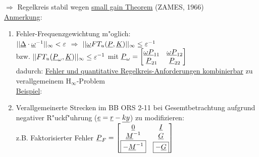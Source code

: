 \documentclass[openany,a4paper,11pt]{book}
\begin{document}
$\Rightarrow$ Regelkreis stabil wegen \uline{small gain Theorem}  (ZAMES, 1966)\\
\uline{Anmerkung}:\begin{enumerate}
    \item Fehler-Frequenzgewichtung m"oglich:\\
    $||\uline{\Delta}\cdot\uline{\omega}^{-1}||_\infty<\varepsilon$ $\Rightarrow$ $||\uline{\omega} FT_u(\uline{P},\uline{K})||_\infty\leq\varepsilon^{-1}$\\
    bzw. $|| FT_u(\uline{P}_\omega,\uline{K})||_\infty\leq\varepsilon^{-1}$ mit $\uline{P}_\omega=\begin{bmatrix} \uline{\omega P}_{11}&\uline{\omega P}_{12}\\\uline{P}_{21}&\uline{P}_{22}\end{bmatrix}$\\
    dadurch: \uline{Fehler und quantitative Regelkreis-Anforderungen kombinierbar} zu verallgemeinem H$_\infty$-Problem\\
    \uline{Beispiel}: 
    \item Verallgemeinerte Strecken im BB ORS 2-11 bei Gesemtbetrachtung aufgrund negativer R"uckf"uhrung ($\uline{e}=\uline{r}-\uline{ky}$) zu modifizieren:\\
    z.B. Faktorisierter Fehler $\uline{P}_F=\begin{bmatrix}\uline{0}&\uline{I}\\\uline{M}^{-1}&\uline{G}\\ \boxed{-\uline{M}^{-1}}&\boxed{-\uline{G}}\end{bmatrix}$
\end{enumerate}
\end{document}
